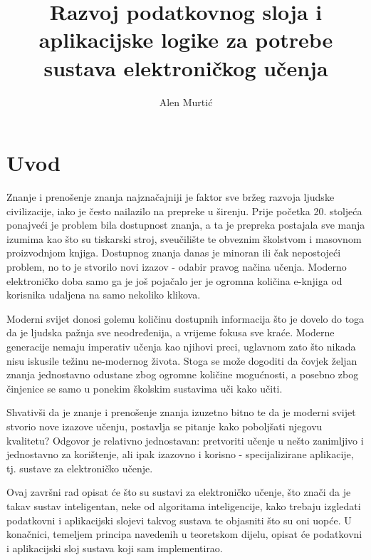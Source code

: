 \documentclass[times, utf8, zavrsni]{fer}
\begin{document}

\title{Razvoj podatkovnog sloja i aplikacijske logike za potrebe sustava elektroničkog učenja}

\author{Alen Murtić}

\maketitle

\izvornik

\zahvala{}

\tableofcontents

\chapter{Uvod}
Znanje i prenošenje znanja najznačajniji je faktor sve bržeg razvoja ljudske civilizacije, iako je često nailazilo na prepreke u širenju. Prije početka 20. stoljeća ponajveći je problem bila dostupnost znanja, a ta je prepreka postajala sve manja izumima kao što su tiskarski stroj, sveučilište te obveznim školstvom i masovnom proizvodnjom knjiga. Dostupnog znanja danas je minoran ili čak nepostojeći problem, no to je stvorilo novi izazov - odabir pravog načina učenja. Moderno elektroničko doba samo ga je još pojačalo jer je ogromna količina e-knjiga od korisnika udaljena na samo nekoliko klikova.
\par
Moderni svijet donosi golemu količinu dostupnih informacija što je dovelo do toga da je ljudska pažnja sve neodređenija, a vrijeme fokusa sve kraće. Moderne generacije nemaju imperativ učenja kao njihovi preci, uglavnom zato što nikada nisu iskusile težinu ne-modernog života. Stoga se može dogoditi da čovjek željan znanja jednostavno odustane zbog ogromne količine mogućnosti, a posebno zbog činjenice se samo u ponekim školskim sustavima uči kako učiti.
\par
Shvativši da je znanje i prenošenje znanja izuzetno bitno te da je moderni svijet stvorio nove izazove učenju, postavlja se pitanje kako poboljšati njegovu kvalitetu? Odgovor je relativno jednostavan: pretvoriti učenje u nešto zanimljivo i jednostavno za korištenje, ali ipak izazovno i korisno - specijalizirane aplikacije, tj. sustave za elektroničko učenje.
\par
Ovaj završni rad opisat će što su sustavi za elektroničko učenje, što znači da je takav sustav inteligentan, neke od algoritama inteligencije, kako trebaju izgledati podatkovni i aplikacijski slojevi takvog sustava te objasniti što su oni uopće. U konačnici, temeljem principa navedenih u teoretskom dijelu, opisat će podatkovni i aplikacijski sloj sustava koji sam implementirao.
\end{document}
